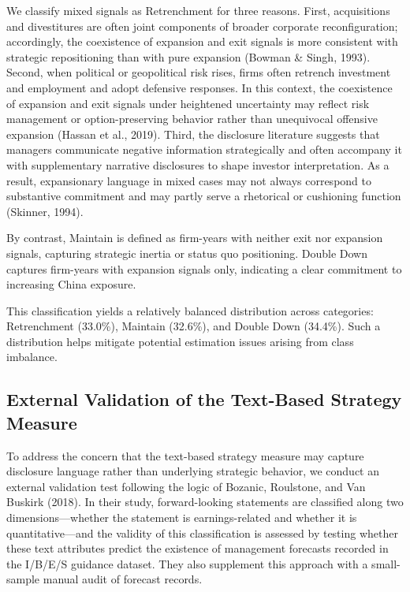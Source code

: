 \documentclass{article}
\begin{document}
We classify mixed signals as Retrenchment for three reasons. First,
acquisitions and divestitures are often joint components of broader
corporate reconfiguration; accordingly, the coexistence of expansion and
exit signals is more consistent with strategic repositioning than with
pure expansion (Bowman \& Singh, 1993). Second, when political or
geopolitical risk rises, firms often retrench investment and employment
and adopt defensive responses. In this context, the coexistence of
expansion and exit signals under heightened uncertainty may reflect risk
management or option-preserving behavior rather than unequivocal
offensive expansion (Hassan et al., 2019). Third, the disclosure
literature suggests that managers communicate negative information
strategically and often accompany it with supplementary narrative
disclosures to shape investor interpretation. As a result, expansionary
language in mixed cases may not always correspond to substantive
commitment and may partly serve a rhetorical or cushioning function
(Skinner, 1994).

By contrast, Maintain is defined as firm-years with neither exit nor
expansion signals, capturing strategic inertia or status quo
positioning. Double Down captures firm-years with expansion signals
only, indicating a clear commitment to increasing China exposure.

This classification yields a relatively balanced distribution across
categories: Retrenchment (33.0\%), Maintain (32.6\%), and Double Down
(34.4\%). Such a distribution helps mitigate potential estimation issues
arising from class imbalance.

\subsection{External Validation of the Text-Based Strategy Measure}\label{external-validation-of-the-text-based-strategy-measure}

To address the concern that the text-based strategy measure may capture
disclosure language rather than underlying strategic behavior, we
conduct an external validation test following the logic of Bozanic,
Roulstone, and Van Buskirk (2018). In their study, forward-looking
statements are classified along two dimensions---whether the statement
is earnings-related and whether it is quantitative---and the validity of
this classification is assessed by testing whether these text attributes
predict the existence of management forecasts recorded in the I/B/E/S
guidance dataset. They also supplement this approach with a small-sample
manual audit of forecast records.
\end{document}
